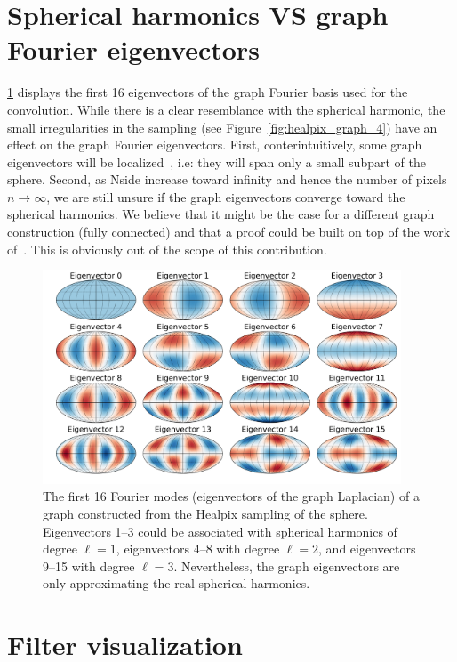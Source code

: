 \documentclass[final,twocolumn,3p,times,authoryear]{elsarticle}
\newcommand{\figref}[1]{Figure~\ref{fig:#1}}
\newcommand{\1}{\b{1}}              %
\newcommand{\0}{\b{0}}              %
\begin{document}
\section{Spherical harmonics VS graph Fourier eigenvectors}
\ref{fig:graph_harmonics} displays the first 16 eigenvectors of the
graph Fourier basis used for the convolution. While there is a clear
resemblance with the spherical harmonic, the small irregularities in the
sampling (see \figref{healpix_graph_4}) have an effect on the
graph Fourier eigenvectors. First, conterintuitively, some graph eigenvectors will be
localized~\cite{perraudin2018global}, i.e: they will span only a small subpart
of the sphere.  Second, as Nside increase toward infinity and hence the number
of pixels $n\rightarrow \infty$, we are still unsure if the graph eigenvectors
converge toward the spherical harmonics. We believe that it might be the case
for a different graph construction (fully connected) and that a proof could be
built on top of the work of~\cite{belkin2007convergence}. This is obviously
out of the scope of this contribution.

\label{sec:spherical_harmonics}
\begin{figure}[!htb]
\centering
\includegraphics[width=0.95\textwidth]{figures/eigenvectors.pdf}
\caption{The first 16 Fourier modes (eigenvectors of the graph Laplacian) of a graph constructed from the Healpix sampling of the sphere. Eigenvectors 1--3 could be associated with spherical harmonics of degree $\ell=1$, eigenvectors 4--8 with degree $\ell=2$, and eigenvectors 9--15 with degree $\ell=3$. Nevertheless, the graph eigenvectors are only approximating the real spherical harmonics.}
\label{fig:graph_harmonics}
\end{figure}



\section{Filter visualization}
\label{sec:filter_visualization}
\end{document}

